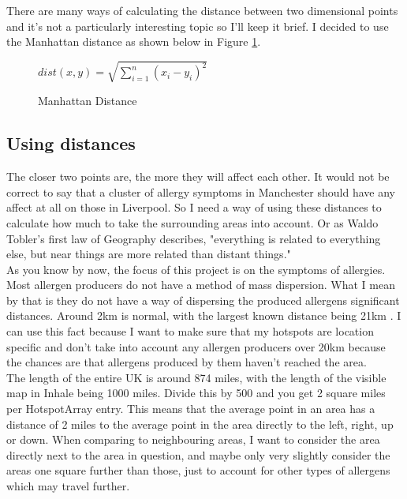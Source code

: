 There are many ways of calculating the distance between two dimensional points and it's not a particularly interesting topic so I'll keep it brief. I decided to use the Manhattan distance as shown below in Figure \ref{dia:manhat}.\\

\begin{figure}[h]
\begin{center}
$dist (x, y)  = \sqrt{\sum_{i=1}^n (x_i - y_i)^2 }$
\caption{Manhattan Distance}
\label{dia:manhat}
\end{center}
\end{figure}

\subsection{Using distances}

The closer two points are, the more they will affect each other. It would not be correct to say that a cluster of allergy symptoms in Manchester should have any affect at all on those in Liverpool. So I need a way of using these distances to calculate how much to take the surrounding areas into account. Or as Waldo Tobler's first law of Geography describes, "everything is related to everything else, but near things are more related than distant things." \cite{waldo}\\

As you know by now, the focus of this project is on the symptoms  of allergies. Most allergen producers do not have a method of mass dispersion. What I mean by that is they do not have a way of dispersing the produced allergens significant distances. Around 2km is normal, with the largest known distance being 21km \cite{pollenwr}. I can use this fact because I want to make sure that my hotspots are location specific and don't take into account any allergen producers over 20km because the chances are that allergens produced by them haven't reached the area.\\

The length of the entire UK is around 874 miles, with the length of the visible map in Inhale being 1000 miles. Divide this by 500 and you get 2 square miles per HotspotArray entry. This means that the average point in an area has a distance of 2 miles to the average point in the area directly to the left, right, up or down. When comparing to neighbouring areas, I want to consider the area directly next to the area in question, and maybe only very slightly consider the areas one square further than those, just to account for other types of allergens which may travel further.\\

